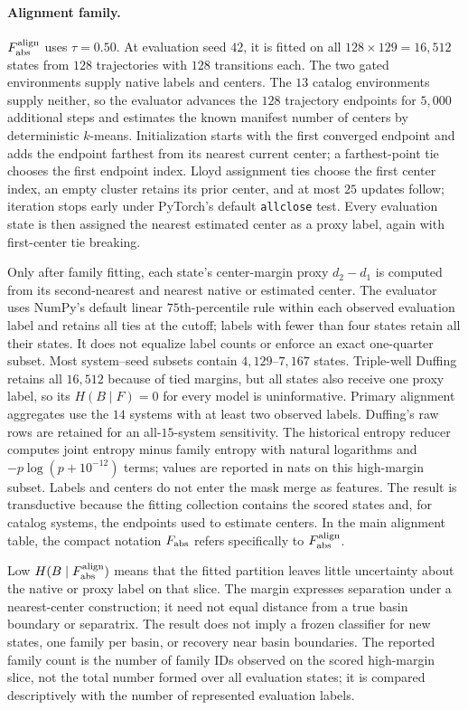 \paragraph{Alignment family.}
\(F_{\rm abs}^{\rm align}\) uses \(\tau=0.50\). At evaluation seed \(42\), it is fitted on all \(128\times129=16{,}512\) states from \(128\) trajectories with \(128\) transitions each. The two gated environments supply native labels and centers. The \(13\) catalog environments supply neither, so the evaluator advances the \(128\) trajectory endpoints for \(5{,}000\) additional steps and estimates the known manifest number of centers by deterministic \(k\)-means. Initialization starts with the first converged endpoint and adds the endpoint farthest from its nearest current center; a farthest-point tie chooses the first endpoint index. Lloyd assignment ties choose the first center index, an empty cluster retains its prior center, and at most \(25\) updates follow; iteration stops early under PyTorch's default \texttt{allclose} test. Every evaluation state is then assigned the nearest estimated center as a proxy label, again with first-center tie breaking.

Only after family fitting, each state's center-margin proxy \(d_2-d_1\) is computed from its second-nearest and nearest native or estimated center. The evaluator uses NumPy's default linear \(75\)th-percentile rule within each observed evaluation label and retains all ties at the cutoff; labels with fewer than four states retain all their states. It does not equalize label counts or enforce an exact one-quarter subset. Most system--seed subsets contain \(4{,}129\)--\(7{,}167\) states. Triple-well Duffing retains all \(16{,}512\) because of tied margins, but all states also receive one proxy label, so its \(H(B\mid F)=0\) for every model is uninformative. Primary alignment aggregates use the \(14\) systems with at least two observed labels. Duffing's raw rows are retained for an all-\(15\)-system sensitivity. The historical entropy reducer computes joint entropy minus family entropy with natural logarithms and \(-p\log(p+10^{-12})\) terms; values are reported in nats on this high-margin subset. Labels and centers do not enter the mask merge as features. The result is transductive because the fitting collection contains the scored states and, for catalog systems, the endpoints used to estimate centers. In the main alignment table, the compact notation \(F_{\rm abs}\) refers specifically to \(F_{\rm abs}^{\rm align}\).

Low \(H(B\mid F_{\rm abs}^{\rm align})\) means that the fitted partition leaves little uncertainty about the native or proxy label on that slice. The margin expresses separation under a nearest-center construction; it need not equal distance from a true basin boundary or separatrix. The result does not imply a frozen classifier for new states, one family per basin, or recovery near basin boundaries. The reported family count is the number of family IDs observed on the scored high-margin slice, not the total number formed over all evaluation states; it is compared descriptively with the number of represented evaluation labels.

